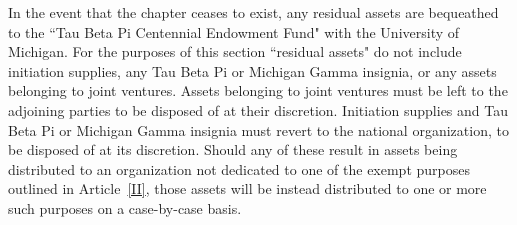 In the event that the chapter ceases to exist, any residual assets are bequeathed to the ``Tau Beta Pi Centennial Endowment Fund" with the University of Michigan.
For the purposes of this section ``residual assets" do not include initiation supplies, any Tau Beta Pi or Michigan Gamma insignia, or any assets belonging to joint ventures.
Assets belonging to joint ventures must be left to the adjoining parties to be disposed of at their discretion.
Initiation supplies and Tau Beta Pi or Michigan Gamma insignia must revert to the national organization, to be disposed of at its discretion.
Should any of these result in assets being distributed to an organization not dedicated to one of the exempt purposes outlined in Article~\ref{II}, those assets will be instead distributed to one or more such purposes on a case-by-case basis.